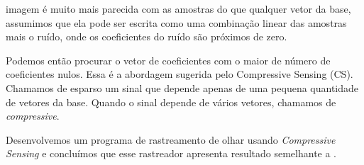  imagem é muito mais parecida com as amostras do que qualquer vetor da base, assumimos que ela pode ser escrita como uma combinação linear das amostras mais o ruído, onde os coeficientes do ruído são próximos de zero.

Podemos então procurar o vetor de coeficientes com o maior de número de coeficientes nulos. Essa é a abordagem sugerida pelo Compressive Sensing (CS). Chamamos de esparso um sinal que depende apenas de uma pequena quantidade de vetores da base. Quando o sinal depende de vários vetores, chamamos de \textit{compressive}.

Desenvolvemos um programa de rastreamento de olhar usando \textit{Compressive Sensing} e concluímos que esse rastreador apresenta resultado semelhante a .